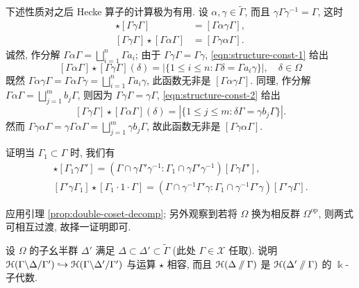 \begin{example}\label{eg:coset-normalizer}
	下述性质对之后 Hecke 算子的计算极为有用. 设 $\alpha, \gamma \in \widetilde{\Gamma}$, 而且 $\gamma \Gamma \gamma^{-1} = \Gamma$, 这时
	\begin{align*}
		[\Gamma\alpha\Gamma] \star [\Gamma\gamma\Gamma] & = [\Gamma\alpha\gamma\Gamma], \\
		[\Gamma\gamma\Gamma] \star [\Gamma\alpha\Gamma] & = [\Gamma\gamma\alpha\Gamma].
	\end{align*}
	诚然, 作分解 $\Gamma\alpha\Gamma = \bigsqcup_{i=1}^n \Gamma a_i$; 由于 $\Gamma\gamma\Gamma = \Gamma\gamma$, \eqref{eqn:structure-const-1} 给出
	\[ [\Gamma\alpha\Gamma] \star [\Gamma \gamma \Gamma](\delta) = \left| \{ 1 \leq i \leq n: \Gamma \delta = \Gamma a_i \gamma \} \right|, \quad \delta \in \Omega \]
	既然 $\Gamma\alpha\gamma\Gamma = \Gamma\alpha\Gamma \gamma = \bigsqcup_{i=1}^n \Gamma a_i \gamma$, 此函数无非是 $[\Gamma\alpha\gamma\Gamma]$. 同理, 作分解 $\Gamma\alpha\Gamma = \bigsqcup_{j=1}^m b_j \Gamma$, 则因为 $\Gamma\gamma\Gamma = \gamma\Gamma$, \eqref{eqn:structure-const-2} 给出
	\[ [\Gamma\gamma\Gamma] \star [\Gamma \alpha \Gamma](\delta) = \left| \{ 1 \leq j \leq m : \delta\Gamma = \gamma b_j \Gamma \} \right|. \]
	然而 $\Gamma\gamma\alpha\Gamma = \gamma \Gamma\alpha\Gamma = \bigsqcup_{j=1}^m \gamma b_j \Gamma$, 故此函数无非是 $[\Gamma\gamma\alpha\Gamma]$.
\end{example}

\begin{exercise}\label{ex:coset-mult}
	证明当 $\Gamma_1 \subset \Gamma$ 时, 我们有
	\begin{gather*}
		[\Gamma \cdot 1 \cdot \Gamma_1] \star [\Gamma_1 \gamma \Gamma'] = \left( \Gamma \cap \gamma \Gamma' \gamma^{-1} : \Gamma_1 \cap \gamma \Gamma' \gamma^{-1} \right) [\Gamma \gamma \Gamma'], \\
		[\Gamma'\gamma\Gamma_1] \star [\Gamma_1 \cdot 1 \cdot \Gamma] = \left( \Gamma \cap \gamma^{-1} \Gamma' \gamma : \Gamma_1 \cap \gamma^{-1} \Gamma' \gamma \right) [\Gamma'\gamma\Gamma].
	\end{gather*}
	\begin{hint} 应用引理 \ref{prop:double-coset-decomp}; 另外观察到若将 $\Omega$ 换为相反群 $\Omega^{\mathrm{op}}$, 则两式可相互过渡, 故择一证明即可. \end{hint}
\end{exercise}

\begin{exercise}
	设 $\Omega$ 的子幺半群 $\Delta'$ 满足 $\Delta \subset \Delta' \subset \widetilde{\Gamma}$ (此处 $\Gamma \in \mathcal{X}$ 任取). 说明 $\EuScript{H}(\Gamma \backslash \Delta /\Gamma') \hookrightarrow \EuScript{H}(\Gamma \backslash \Delta' /\Gamma')$ 与运算 $\star$ 相容, 而且 $\EuScript{H}(\Delta \sslash \Gamma)$ 是 $\EuScript{H}(\Delta' \sslash \Gamma)$ 的 $\Bbbk$-子代数.
\end{exercise}

